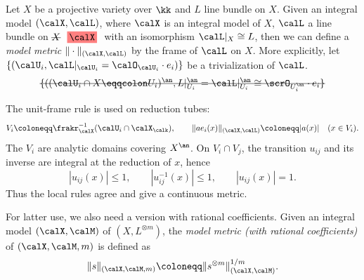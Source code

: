 \begin{construction}[label=\labelNFM{constr:model-metric}, status=draft, tag=0000000]
	Let $X$ be a projective variety over $\kk$ and $L$ line bundle on $X$.
	Given an integral model $(\calX,\calL)$, where $\calX$ is an integral model of $X$, $\calL$ a line bundle on $\latexdeletedmath{X}\latexaddedmath{\calX}$ with an isomorphism $\calL|_X \cong L$,
	then we can define a \emph{model metric} $\|\cdot\|_{(\calX,\calL)}$ by the frame of $\calL$ on $X$.
	More explicitly, let $\{(\calU_i,\calL|_{\calU_i} = \calO_{\calU_i} \cdot e_i) \}$ be a trivialization of $\calL$.
	\[ \latexdeletedmath{\{((\calU_i \cap X \eqqcolon U_i)^{\an}, L|_{U_i}^{\an} = \calL|_{U_i}^{\an} \cong \scrO_{U_i^\an} \cdot e_i\}} \]
	\begin{latexmathchange}
		The unit-frame rule is used on reduction tubes:
		\[ V_i \coloneqq \frakr_\calX^{-1}(\calU_i\cap\calX_\calk), \qquad \|ae_i(x)\|_{(\calX,\calL)} \coloneqq |a(x)|\quad(x \in V_i). \]
		The $V_i$ are analytic domains covering $X^\an$.
		On $V_i\cap V_j$, the transition $u_{ij}$ and its inverse are integral at the reduction of $x$, hence
		\[ |u_{ij}(x)| \leq 1, \qquad |u_{ij}^{-1}(x)| \leq 1, \qquad |u_{ij}(x)| = 1. \]
		Thus the local rules agree and give a continuous metric.
	\end{latexmathchange}

	For latter use, we also need a version with rational coefficients.
	Given an integral model $(\calX,\calM)$ of $(X,L^{\otimes m})$, the \emph{model metric (with rational coefficients)} of $(\calX,\calM, m)$ is defined as
	\[ \|s\|_{(\calX,\calM,m)} \coloneqq \|s^{\otimes m}\|_{(\calX,\calM)}^{1/m}.\]
\end{construction}

